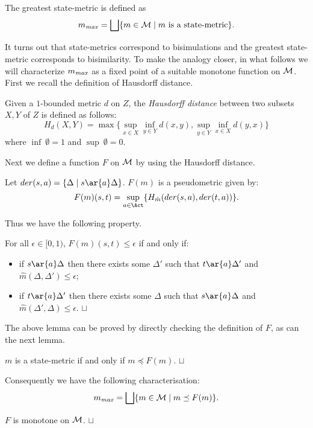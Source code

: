\documentclass{article}
\def \CM{{\cal M}}
\def\squareforqed{\hbox{\rlap{$\sqcap$}$\sqcup$}}
\def\qed{\ifmmode\squareforqed\else{\unskip\nobreak\hfil
\penalty50\hskip1em\null\nobreak\hfil\squareforqed
\parfillskip=0pt\finalhyphendemerits=0\endgraf}\fi}
\begin{document}
The greatest state-metric is defined as
\[m_{\it max}=\bigsqcup\{m\in\CM\mid m \mbox{ is a state-metric}\}.\]

It turns out that state-metrics correspond to bisimulations and the
greatest state-metric corresponds to bisimilarity. To make the
analogy closer, in what follows we will characterize $m_{\it max}$
as a fixed point of a suitable monotone function on $\CM$. First we
recall the definition of Hausdorff distance.
\begin{definition}
Given a $1$-bounded metric $d$ on $Z$, the {\em Hausdorff distance}
between two subsets $X,Y$ of $Z$ is defined as follows:
\[H_d(X,Y)=\max\{\sup_{x\in X}\inf_{y\in Y}d(x,y),\sup_{y\in Y}\inf_{x\in
  X}d(y,x)\}\]
where $\inf\ \emptyset=1$ and $\sup\ \emptyset=0$.
\end{definition}
Next we define a function $F$ on $\CM$ by using the Hausdorff
distance.

\begin{definition}
Let $der(s,a)=\{\Delta\mid s\ar{a}\Delta\}$. $F(m)$ is a
pseudometric given by:
\begin{displaymath}
F(m)(s,t)=\sup_{a\in\Act}\{H_{\hat{m}}(der(s,a),der(t,a))\}.
\end{displaymath}
\end{definition}

Thus we have the following property.

\begin{lemma}
For all $\epsilon\in [0,1)$, $F(m)(s,t)\leq\epsilon$ if and only if:
\begin{itemize}
\item if $s\ar{a}\Delta$ then there exists some $\Delta'$ such that
  $t\ar{a}\Delta'$ and $\hat{m}(\Delta,\Delta')\leq\epsilon$;
\item if $t\ar{a}\Delta'$ then there exists some $\Delta$ such that
  $s\ar{a}\Delta$ and $\hat{m}(\Delta',\Delta)\leq\epsilon$. \hfill\qed
\end{itemize}

\end{lemma}

The above lemma can be proved by directly checking the definition of
$F$, as can the next lemma.
\begin{lemma}\label{l:smfix}
$m$ is a state-metric if and only if $m\preceq F(m)$. \hfill\qed
\end{lemma}
Consequently we have the following characterisation:
\[m_{\it max}=\bigsqcup\{m\in\CM\mid m\preceq F(m)\}.\]

\begin{lemma}\label{l:mono}
$F$ is monotone on $\CM$. \hfill\qed
\end{lemma}
\end{document}
